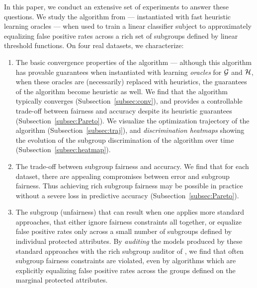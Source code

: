 In this paper, we conduct an extensive set of experiments to answer these questions. We study the algorithm from \cite{KNRW18} --- instantiated with fast heuristic learning oracles --- when used to train a linear classifier subject to approximately equalizing false positive rates across a rich set of subgroups defined by linear threshold functions. On four real datasets, we characterize:


\begin{enumerate}
\item The basic convergence properties of the algorithm --- although this algorithm has provable guarantees when instantiated with learning \emph{oracles} for $\mathcal{G}$ and $\mathcal{H}$, when these oracles are (necessarily) replaced with heuristics, the guarantees of the algorithm become heuristic as well. We find that the algorithm typically converges (Subsection~\ref{subsec:conv}), and provides a controllable trade-off between fairness and accuracy despite its heuristic guarantees (Subsection~\ref{subsec:Pareto}). We visualize the optimization trajectory of the algorithm (Subsection~\ref{subsec:traj}), and \textit{discrimination heatmaps} showing the evolution of the subgroup discrimination of the algorithm over time (Subsection~\ref{subsec:heatmap}).
    \item The trade-off between subgroup fairness and accuracy. We find that for each dataset, there are appealing compromises between
	error and subgroup fairness. Thus achieving rich subgroup fairness may be possible in practice
	without a severe loss in predictive accuracy (Subsection~\ref{subsec:Pareto}).
\item The subgroup (unfairness) that can result when one applies more standard approaches, that either ignore fairness constraints all together, or equalize false positive rates only across a small number of subgroups defined by individual protected attributes. By \textit{auditing} the models produced by these standard approaches with the rich subgroup auditor of \cite{KNRW18}, we find that often subgroup fairness constraints are violated, even by algorithms which are explicitly equalizing false positive rates across the groups defined on the marginal protected attributes.
\end{enumerate}

